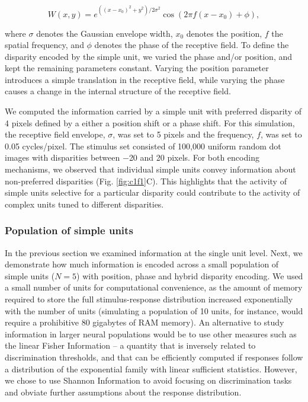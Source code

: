 \begin{equation}
  W(x,y) = e^{((x-x_0)^2 + y^2)/2\sigma^2} \cos (2 \pi f (x-x_0) + \phi),
\end{equation}

where $\sigma$ denotes the Gaussian envelope width, $x_0$ denotes the position, $f$ the spatial frequency, and $\phi$ denotes the phase of the receptive field. To define the disparity encoded by the simple unit, we varied the phase and/or position, and kept the remaining parameters constant. Varying the position parameter introduces a simple translation in the receptive field, while varying the phase causes a change in the internal structure of the receptive field. 

We computed the information carried by a simple unit with preferred disparity of 4 pixels defined by a either a position shift or a phase shift. For this simulation, the receptive field envelope, $\sigma$, was set to 5 pixels and the frequency, $f$, was set to 0.05 cycles/pixel. The stimulus set consisted of 100,000 uniform random dot images with disparities between $-$20 and 20 pixels. For both encoding mechanisms, we observed that individual simple units convey information about non-preferred disparities (Fig. \ref{fig:c1f1}C). This highlights that the activity of simple units selective for a particular disparity could contribute to the activity of complex units tuned to different disparities.

\subsubsection*{Population of simple units}

In the previous section we examined information at the single unit level. Next, we demonstrate how much information is encoded across a small population of simple units ($N=5$) with position, phase and hybrid disparity encoding. We used a small number of units for computational convenience, as the amount of memory required to store the full stimulus-response distribution increased exponentially with the number of units (simulating a population of 10 units, for instance, would require a prohibitive 80 gigabytes of RAM memory). An alternative to study information in larger neural populations would be to use other measures such as the linear Fisher Information -- a quantity that is inversely related to discrimination thresholds, and that can be efficiently computed if responses follow a distribution of the exponential family with linear sufficient statistics\cite{Moreno-Bote:2014hy}. However, we chose to use Shannon Information to avoid focusing on discrimination tasks and obviate further assumptions about the response distribution. 

